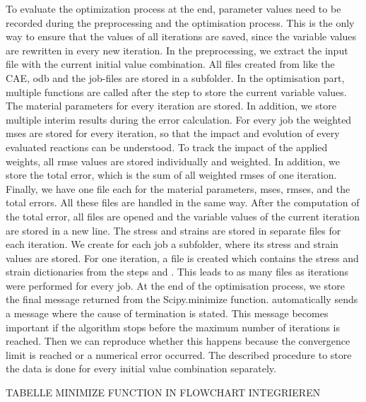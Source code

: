 To evaluate the optimization process at the end, parameter values need to be recorded during the preprocessing and the optimisation process. This is the only way to ensure that the values of all iterations are saved, since the variable values are rewritten in every new iteration. In the preprocessing, we extract the input file with the current initial value combination. All files created from  like the CAE, \acrshort{odb} and the job-files are stored in a subfolder. In the optimisation part, multiple functions are called after the step  to store the current variable values. The material parameters for every iteration are stored. In addition, we store multiple interim results during the error calculation. For every job the weighted \acrshort{mse}s are stored for every iteration, so that the impact and evolution of every evaluated reactions can be understood. To track the impact of the applied weights, all \acrshort{rmse} values are stored individually and weighted. In addition, we store the total error, which is the sum of all weighted \acrshort{rmse}s of one iteration. Finally, we have one file each for the material parameters, \acrshort{mse}s, \acrshort{rmse}s, and the total errors. All these files are handled in the same way. After the computation of the total error, all files are opened and the variable values of the current iteration are stored in a new line. The stress and strains are stored in separate files for each iteration. We create for each job a subfolder, where its stress and strain values are stored. For one iteration, a file is created which contains the stress and strain dictionaries from the steps  and . This leads to as many files as iterations were performed for every job. At the end of the optimisation process, we store the final message returned from the Scipy.minimize function.  automatically sends a message where the cause of termination is stated. This message becomes important if the algorithm stops before the maximum number of iterations is reached. Then we can reproduce whether this happens because the convergence limit is reached or a numerical error occurred. The described procedure to store the data is done for every initial value combination separately.

TABELLE
MINIMIZE FUNCTION IN FLOWCHART INTEGRIEREN




